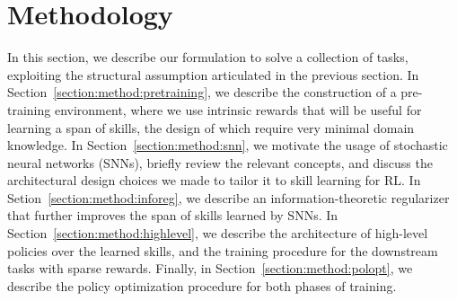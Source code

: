 \documentclass{article} %
\begin{document}

\section{Methodology}

In this section, we describe our formulation to solve a collection of tasks, exploiting the structural assumption articulated in the previous section. In Section~\ref{section:method:pretraining}, we describe the construction of a pre-training environment, where we use intrinsic rewards that will be useful for learning a span of skills, the design of which require very minimal domain knowledge. In Section~\ref{section:method:snn}, we motivate the usage of stochastic neural networks (SNNs), briefly review the relevant concepts, and discuss the architectural design choices we made to tailor it to skill learning for RL. 
In Setion~\ref{section:method:inforeg}, we describe an information-theoretic regularizer that further improves the span of skills learned by SNNs. In Section~\ref{section:method:highlevel}, we describe the architecture of high-level policies over the learned skills, and the training procedure for the downstream tasks with sparse rewards. Finally, in Section~\ref{section:method:polopt}, we describe the policy optimization procedure for both phases of training.%
\end{document}
